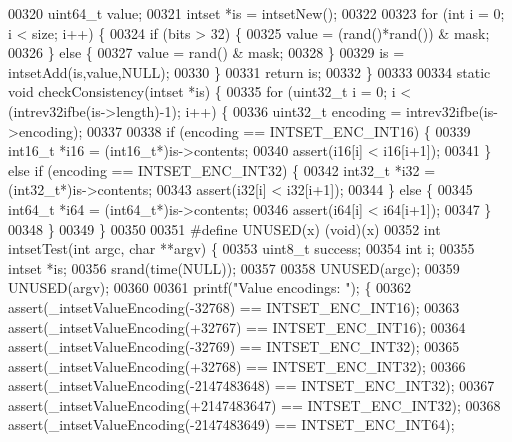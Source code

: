\begin{DoxyCode}
{{{00320     uint64\_t value;
00321     intset *is = intsetNew();
00322 
00323     \textcolor{keywordflow}{for} (\textcolor{keywordtype}{int} i = 0; i < size; i++) \{
00324         \textcolor{keywordflow}{if} (bits > 32) \{
00325             value = (rand()*rand()) & mask;
00326         \} \textcolor{keywordflow}{else} \{
00327             value = rand() & mask;
00328         \}
00329         is = intsetAdd(is,value,NULL);
00330     \}
00331     \textcolor{keywordflow}{return} is;
00332 \}
00333 
00334 \textcolor{keyword}{static} \textcolor{keywordtype}{void} checkConsistency(intset *is) \{
00335     \textcolor{keywordflow}{for} (uint32\_t i = 0; i < (intrev32ifbe(is->length)-1); i++) \{
00336         uint32\_t encoding = intrev32ifbe(is->encoding);
00337 
00338         \textcolor{keywordflow}{if} (encoding == INTSET\_ENC\_INT16) \{
00339             int16\_t *i16 = (int16\_t*)is->contents;
00340             assert(i16[i] < i16[i+1]);
00341         \} \textcolor{keywordflow}{else} \textcolor{keywordflow}{if} (encoding == INTSET\_ENC\_INT32) \{
00342             int32\_t *i32 = (int32\_t*)is->contents;
00343             assert(i32[i] < i32[i+1]);
00344         \} \textcolor{keywordflow}{else} \{
00345             int64\_t *i64 = (int64\_t*)is->contents;
00346             assert(i64[i] < i64[i+1]);
00347         \}
00348     \}
00349 \}
00350 
00351 \textcolor{preprocessor}{#}\textcolor{preprocessor}{define} \textcolor{preprocessor}{UNUSED}\textcolor{preprocessor}{(}\textcolor{preprocessor}{x}\textcolor{preprocessor}{)} \textcolor{preprocessor}{(}\textcolor{preprocessor}{void}\textcolor{preprocessor}{)}\textcolor{preprocessor}{(}\textcolor{preprocessor}{x}\textcolor{preprocessor}{)}
00352 \textcolor{keywordtype}{int} intsetTest(\textcolor{keywordtype}{int} argc, \textcolor{keywordtype}{char} **argv) \{
00353     uint8\_t success;
00354     \textcolor{keywordtype}{int} i;
00355     intset *is;
00356     srand(time(NULL));
00357 
00358     UNUSED(argc);
00359     UNUSED(argv);
00360 
00361     printf(\textcolor{stringliteral}{"Value encodings: "}); \{
00362         assert(\_intsetValueEncoding(-32768) == INTSET\_ENC\_INT16);
00363         assert(\_intsetValueEncoding(+32767) == INTSET\_ENC\_INT16);
00364         assert(\_intsetValueEncoding(-32769) == INTSET\_ENC\_INT32);
00365         assert(\_intsetValueEncoding(+32768) == INTSET\_ENC\_INT32);
00366         assert(\_intsetValueEncoding(-2147483648) == INTSET\_ENC\_INT32);
00367         assert(\_intsetValueEncoding(+2147483647) == INTSET\_ENC\_INT32);
00368         assert(\_intsetValueEncoding(-2147483649) == INTSET\_ENC\_INT64);
}}}
\end{DoxyCode}
